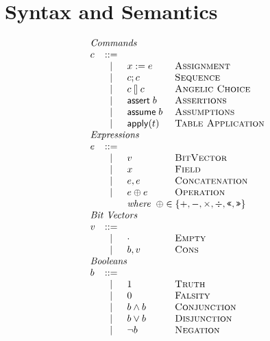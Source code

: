 \section{Syntax and Semantics}


\begin{figure}[ht]
  \[\begin{array}{l c l l}
      \multicolumn{4}{l}{\textit{Commands}}\\
      c & ::=& \\
        & \mid & x := e & \textsc{Assignment}\\
        & \mid & c;c & \textsc{Sequence} \\
        & \mid & c \angel c & \textsc{Angelic Choice}\\
        & \mid & \assert b & \textsc{Assertions} \\
        & \mid & \assume b & \textsc{Assumptions} \\
        & \mid & \apply t & \textsc{Table Application}\\
      \multicolumn{4}{l}{\textit{Expressions}} \\
      e & ::= & \\
        & \mid & v            & \textsc{BitVector} \\
        & \mid & x            & \textsc{Field} \\
        & \mid & e,e          & \textsc{Concatenation} \\
        & \mid & e \oplus e   & \textsc{Operation} \\
        & &  \multicolumn{2}{l}{\textit{where}\;\; \oplus \in \{+,-,\times, \div, \texttt{<<}, \texttt{>>} \}} \\
      \multicolumn{4}{l}{\textit{Bit Vectors}}\\
      v & ::= & \\
        & \mid & \cdot & \textsc{Empty} \\
        & \mid & b,v   & \textsc{Cons} \\
      \multicolumn{4}{l}{\textit{Booleans}}\\
      b & ::= & \\
        & \mid & \TRUE & \textsc{Truth} \\
        & \mid & \FALSE & \textsc{Falsity} \\
        & \mid & b \wedge b & \textsc{Conjunction} \\
        & \mid & b \vee b & \textsc{Disjunction} \\
        & \mid & \neg b & \textsc{Negation} \\

\end{array}\]
\end{figure}
